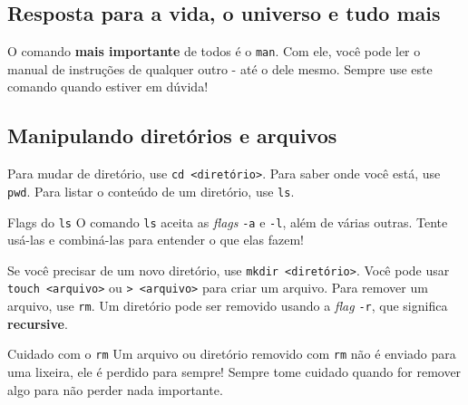 \documentclass{beamer}
\begin{document}
\subsection{Resposta para a vida, o universo e tudo mais}

\begin{frame}

	\large{O comando \textbf{mais importante} de todos é o \texttt{man}. Com ele, você
	pode ler o manual de instruções de qualquer outro - até o dele mesmo.}
	\newline
	\newline
	Sempre use este comando quando estiver em dúvida!

\end{frame}

\subsection{Manipulando diretórios e arquivos}

\begin{frame}

	Para mudar de diretório, use \texttt{cd <diretório>}.
	\newline
	\newline
	Para saber onde você está, use \texttt{pwd}.
	\newline
	\newline
	Para listar o conteúdo de um diretório, use \texttt{ls}.

	\begin{block}{Flags do \texttt{ls}}
		O comando \texttt{ls} aceita as \textit{flags} \texttt{-a} e \texttt{-l},
		além de várias outras. Tente usá-las e combiná-las para entender o que
		elas fazem!
	\end{block}

\end{frame}

\begin{frame}
	
	Se você precisar de um novo diretório, use \texttt{mkdir <diretório>}.
	\newline
	\newline
	Você pode usar \texttt{touch <arquivo>} ou \texttt{> <arquivo>} para criar um arquivo.
	\newline
	\newline
	Para remover um arquivo, use \texttt{rm}. Um diretório pode ser removido usando a \textit{flag} \texttt{-r}, que significa \textbf{recursive}.

	\begin{alertblock}{Cuidado com o \texttt{rm}}
		Um arquivo ou	diretório removido com \texttt{rm} não é enviado para uma
		lixeira, ele é perdido para sempre! Sempre tome	cuidado quando for remover
		algo para não perder nada importante.
	\end{alertblock}

\end{frame}
\end{document}
